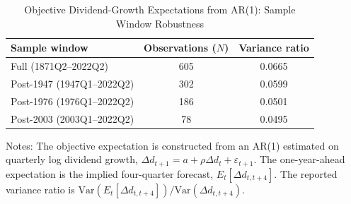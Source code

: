 \begin{table}[t!]
    \centering
    \caption{Objective Dividend-Growth Expectations from AR(1): Sample Window Robustness}
    \label{tab:fact1_ar1_windows}
    \begin{threeparttable}
    \begin{tabular}{lcc}
    \toprule
    Sample window & Observations ($N$) & Variance ratio \\
    \midrule
    Full (1871Q2--2022Q2) & 605 & 0.0665 \\
    Post-1947 (1947Q1--2022Q2) & 302 & 0.0599 \\
    Post-1976 (1976Q1--2022Q2) & 186 & 0.0501 \\
    Post-2003 (2003Q1--2022Q2) & 78 & 0.0495 \\
    \bottomrule
    \end{tabular}
    \begin{tablenotes}[flushleft]
    \footnotesize
    \item Notes: The objective expectation is constructed from an AR(1) estimated on quarterly log dividend growth, $\Delta d_{t+1}=a+\rho\Delta d_t+\varepsilon_{t+1}$. The one-year-ahead expectation is the implied four-quarter forecast, $E_t[\Delta d_{t,t+4}]$. The reported variance ratio is $\mathrm{Var}\!\left(E_t[\Delta d_{t,t+4}]\right)\big/\mathrm{Var}\!\left(\Delta d_{t,t+4}\right)$.
    \end{tablenotes}
    \end{threeparttable}
\end{table}
